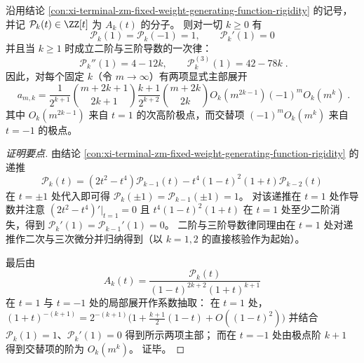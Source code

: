\begin{conclusion}\label{con:xi-terminal-zm-fixed-weight-two-term-asymptotic}
沿用结论 \ref{con:xi-terminal-zm-fixed-weight-generating-function-rigidity} 的记号，并记 \(\mathcal{P}_k(t)\in\ZZ[t]\) 为 \(A_k(t)\) 的分子。
则对一切 \(k\ge 0\) 有
\[
\boxed{\;
\mathcal{P}_k(1)=\mathcal{P}_k(-1)=1,\qquad \mathcal{P}_k'(1)=0\;}
\]
并且当 \(k\ge 1\) 时成立二阶与三阶导数的一次律：
\[
\boxed{\;
\mathcal{P}_k''(1)=4-12k,\qquad \mathcal{P}_k^{(3)}(1)=42-78k\; }.
\]
因此，对每个固定 \(k\)（令 \(m\to\infty\)）有两项显式主部展开
\[
\boxed{\;
a_{m,k}
=\frac{1}{2^{k+1}}\binom{m+2k+1}{2k+1}
\frac{k+1}{2^{k+2}}\binom{m+2k}{2k}
O_k(m^{2k-1})
(-1)^m O_k(m^{k})\; }.
\]
其中 \(O_k(m^{2k-1})\) 来自 \(t=1\) 的次高阶极点，而交替项 \((-1)^mO_k(m^k)\) 来自 \(t=-1\) 的极点。
\end{conclusion}
\begin{proof}[证明要点]
由结论 \ref{con:xi-terminal-zm-fixed-weight-generating-function-rigidity} 的递推
\[
\mathcal{P}_k(t)=(2t^2-t^4)\mathcal{P}_{k-1}(t)-t^4(1-t)^2(1+t)\mathcal{P}_{k-2}(t)
\]
在 \(t=\pm 1\) 处代入即可得 \(\mathcal{P}_k(\pm1)=\mathcal{P}_{k-1}(\pm1)=1\)。
对该递推在 \(t=1\) 处作导数并注意 \((2t^2-t^4)'|_{t=1}=0\) 且 \(t^4(1-t)^2(1+t)\) 在 \(t=1\) 处至少二阶消失，得到 \(\mathcal{P}_k'(1)=\mathcal{P}_{k-1}'(1)=0\)。
二阶与三阶导数律同理由在 \(t=1\) 处对递推作二次与三次微分并归纳得到（以 \(k=1,2\) 的直接核验作为起始）。
\par
最后由
\[
A_k(t)=\frac{\mathcal{P}_k(t)}{(1-t)^{2k+2}(1+t)^{k+1}}
\]
在 \(t=1\) 与 \(t=-1\) 处的局部展开作系数抽取：
在 \(t=1\) 处，
\(
(1+t)^{-(k+1)}=2^{-(k+1)}\bigl(1+\frac{k+1}{2}(1-t)+O((1-t)^2)\bigr)
\)
并结合 \(\mathcal{P}_k(1)=1\)、\(\mathcal{P}_k'(1)=0\) 得到所示两项主部；
而在 \(t=-1\) 处由极点阶 \(k+1\) 得到交替项的阶为 \(O_k(m^k)\)。
证毕。
\end{proof}

